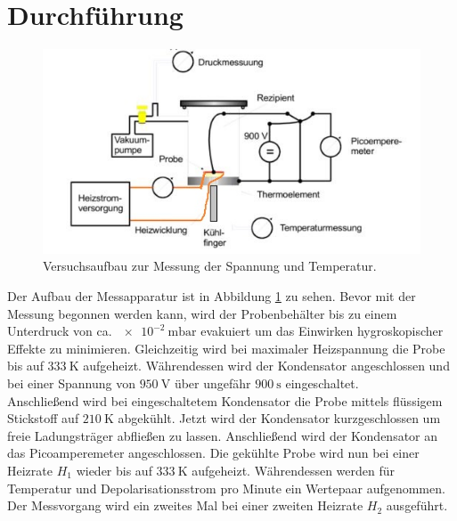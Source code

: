 \section{Durchführung}
\label{sec:Durchführung}
\begin{figure}[H]
  \centering
  \includegraphics{plots/Aufbau.JPG}
  \caption{Versuchsaufbau zur Messung der Spannung und Temperatur.\cite{Anleitung}}
  \label{fig:aufbau}
\end{figure}
Der Aufbau der Messapparatur ist in Abbildung \ref{fig:aufbau} zu sehen. Bevor mit der Messung begonnen werden kann, wird der
Probenbehälter bis zu einem Unterdruck von ca. $\SI{e-2}{\milli\bar}$ evakuiert um das Einwirken hygroskopischer Effekte zu minimieren. Gleichzeitig wird bei maximaler Heizspannung
die Probe bis auf $\SI{333}{\kelvin}$ aufgeheizt. Währendessen wird der Kondensator angeschlossen und bei einer Spannung von
$\SI{950}{\volt}$ über ungefähr $\SI{900}{\second}$ eingeschaltet.\\
Anschließend wird bei eingeschaltetem Kondensator die Probe mittels flüssigem Stickstoff auf $\SI{210}{\kelvin}$ abgekühlt.
Jetzt wird der Kondensator kurzgeschlossen um freie Ladungsträger abfließen zu lassen. Anschließend wird der Kondensator an das Picoamperemeter angeschlossen. Die gekühlte Probe wird nun bei einer Heizrate $H_1$ wieder bis auf $\SI{333}{\kelvin}$ aufgeheizt.
Währendessen werden für Temperatur und Depolarisationsstrom pro Minute ein Wertepaar aufgenommen. Der Messvorgang wird ein zweites Mal bei einer zweiten Heizrate $H_2$ ausgeführt.
